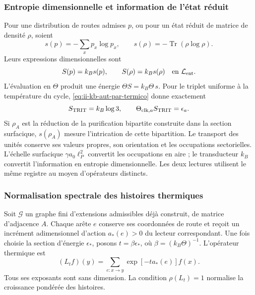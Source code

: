 \subsubsection{Entropie dimensionnelle et information de l'état réduit}

Pour une distribution de routes admises \(p\), ou pour un état réduit de matrice de densité \(\rho\), soient
\[
 s(p)=-\sum_xp_x\log p_x,\qquad
 s(\rho)=-\operatorname{Tr}(\rho\log\rho).
\]
Leurs expressions dimensionnelles sont
\begin{equation}
 S(p)=k_Bs(p),\qquad S(\rho)=k_Bs(\rho)
 \quad\text{en }\mathcal L_{\rm ent}.
 \label{eq:ii-kb-aut-entropia}
\end{equation}
L'évaluation en \(\Theta\) produit une énergie
\(\Theta S=k_B\Theta\,s\). Pour le triplet uniforme à la température
du cycle, \eqref{eq:ii-kb-aut-par-termico} donne exactement
\[
 S_{\rm TRIT}=k_B\log3,\qquad
 \Theta_{{\rm clk},a}S_{\rm TRIT}=\epsilon_a.
\]
Si \(\rho_A\) est la réduction de la purification bipartite construite dans la section surfacique, \(s(\rho_A)\) mesure l'intrication de cette bipartition. Le transport des unités conserve ses valeurs propres, son orientation et les occupations sectorielles. L'échelle surfacique \(\gamma a_0\ell_P^2\) convertit les occupations en aire ; le transducteur \(k_B\) convertit l'information en entropie dimensionnelle. Les deux lectures utilisent le même registre au moyen d'opérateurs distincts.

\subsubsection{Normalisation spectrale des histoires thermiques}

Soit \(\mathcal G\) un graphe fini d'extensions admissibles déjà
construit, de matrice d'adjacence \(A\). Chaque arête \(e\) conserve
ses coordonnées de route et reçoit un incrément adimensionnel d'action
\(a_*(e)>0\) du lecteur correspondant. Une fois choisie la section d'énergie
\(\epsilon_*\), posons \(t=\beta\epsilon_*\), où
\(\beta=(k_B\Theta)^{-1}\). L'opérateur thermique est
\begin{equation}
 (L_tf)(y)=\sum_{e:x\to y}\exp[-t a_*(e)]f(x).
 \label{eq:ii-kb-aut-operador}
\end{equation}
Tous ses exposants sont sans dimension. La condition
\(\rho(L_t)=1\) normalise la croissance pondérée des histoires.

